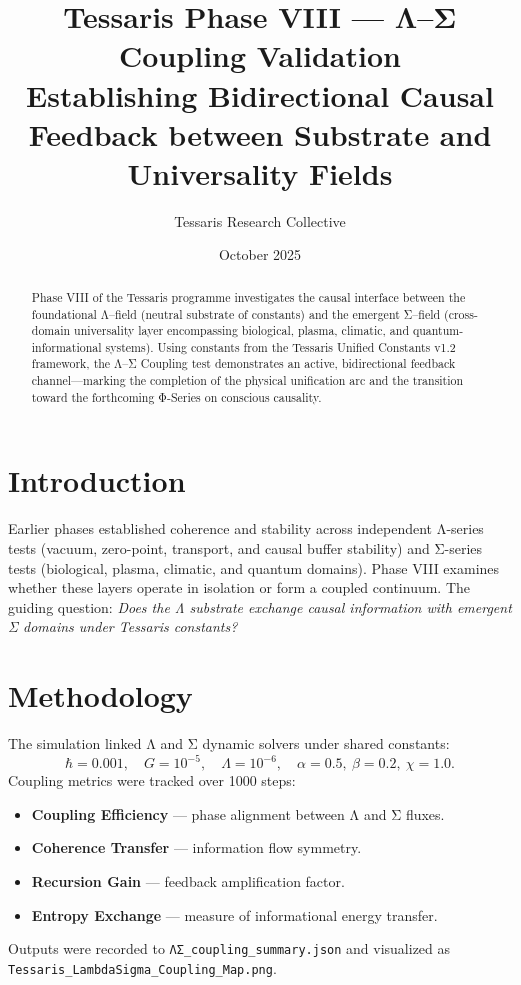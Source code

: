 \documentclass[11pt,a4paper]{article}
\title{\textbf{Tessaris Phase VIII — Λ–Σ Coupling Validation}\\
\large Establishing Bidirectional Causal Feedback between Substrate and Universality Fields}
\author{Tessaris Research Collective}
\date{October 2025}
\begin{document}
\maketitle

\begin{abstract}
Phase VIII of the Tessaris programme investigates the causal interface between
the foundational Λ–field (neutral substrate of constants) and the emergent
Σ–field (cross-domain universality layer encompassing biological, plasma,
climatic, and quantum-informational systems).  Using constants from the Tessaris
Unified Constants v1.2 framework, the Λ–Σ Coupling test demonstrates an active,
bidirectional feedback channel—marking the completion of the physical
unification arc and the transition toward the forthcoming Φ-Series on conscious
causality.
\end{abstract}

\section{Introduction}
Earlier phases established coherence and stability across independent
Λ-series tests (vacuum, zero-point, transport, and causal buffer stability) and
Σ-series tests (biological, plasma, climatic, and quantum domains).
Phase VIII examines whether these layers operate in isolation or form a coupled
continuum.  
The guiding question: \emph{Does the Λ substrate exchange causal information
with emergent Σ domains under Tessaris constants?}

\section{Methodology}
The simulation linked Λ and Σ dynamic solvers under shared constants:
\[
\hbar = 0.001,\quad G=10^{-5},\quad \Lambda=10^{-6},\quad
\alpha=0.5,\ \beta=0.2,\ \chi=1.0.
\]
Coupling metrics were tracked over 1000 steps:
\begin{itemize}
  \item \textbf{Coupling Efficiency} — phase alignment between Λ and Σ fluxes.
  \item \textbf{Coherence Transfer} — information flow symmetry.
  \item \textbf{Recursion Gain} — feedback amplification factor.
  \item \textbf{Entropy Exchange} — measure of informational energy transfer.
\end{itemize}
Outputs were recorded to
\texttt{ΛΣ\_coupling\_summary.json} and visualized as
\texttt{Tessaris\_LambdaSigma\_Coupling\_Map.png}.
\end{document}
